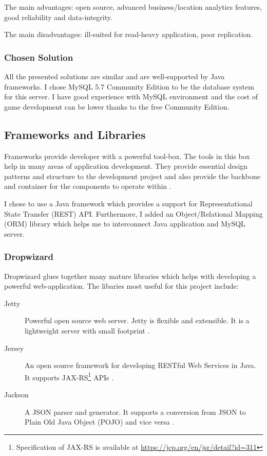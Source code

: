 		The main advantages: open source, advanced business/location analytics features, good reliability and data-integrity.
		
		The main disadvantages: ill-suited for read-heavy application, poor replication.
				
		\subsubsection*{Chosen Solution}
		All the presented solutions are similar and are well-supported by Java frameworks. I chose MySQL 5.7 Community Edition to be the database system for this server. I have good experience with MySQL environment and the cost of game development can be lower thanks to the free Community Edition. 
		
	\subsection{Frameworks and Libraries}
	Frameworks provide developer with a powerful tool-box. The tools in this box help in many areas of application development. They provide essential design patterns and structure to the development project and also provide the backbone and container for the components to operate within \cite{frameworks}.
	
	I chose to use a Java framework which provides a support for Representational State Transfer (REST) API. Furthermore, I added an Object/Relational Mapping (ORM) library which helps me to interconnect Java application and MySQL server.
	
		\subsubsection*{Dropwizard}
		Dropwizard \cite{dropwizard} glues together many mature libraries which helps with developing a powerful web-application. The libaries most useful for this project include:
		\begin{description}
			\item[Jetty] Powerful open source web server. Jetty is flexible and extensible. It is a lightweight server with small footprint \cite{jetty}.
			\item[Jersey] An open source framework for developing RESTful Web Services in Java. It supports JAX-RS\footnote{Specification of JAX-RS is available at \url{https://jcp.org/en/jsr/detail?id=311}} APIs \cite{jersey}.
			\item[Jackson] A JSON parser and generator. It supports a conversion from JSON to Plain Old Java Object (POJO) and vice versa \cite{jackson}.			
		\end{description}
			
